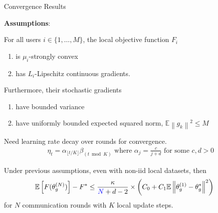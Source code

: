 \documentclass{beamer}
\newcommand\norm[1]{\left\lVert#1\right\rVert}
\begin{document}
\begin{frame}[allowframebreaks]{Convergence Results}

    \textbf{Assumptions}:

    \medskip
    For all users $i \in \{1, \ldots, M\}$, the local objective function $F_i$ 
    \begin{enumerate}
        \item is $\mu_i$-strongly convex 
        \item has $L_i$-Lipschitz continuous gradients.
    \end{enumerate}

    \medskip
    Furthermore, their stochastic gradients
    \begin{enumerate}
        \item have bounded variance
        \item have uniformly bounded expected squared norm, $\mathbb{E} \norm{g_k}^2 \leq M$
    \end{enumerate}


\framebreak
    Need learning rate decay over rounds for convergence.
    \begin{align}
        & \eta_t = \alpha_{\lfloor t / K \rfloor} \beta_{(t \bmod K)} 
            \textrm{ where } \alpha_j = \frac{c}{j + d} \textrm{ for some } c, d > 0 
    \end{align}

    \begin{theorem}
        \label{thm: full}
        Under previous assumptions, even with non-iid local datasets, then
        \begin{align*}
            & \mathbb{E} \left[ F ( \theta_g^{(N)} ) \right] - F^* \leq \dfrac{\kappa}{\textcolor{blue}{N} + d - 2} \times \left( C_0 + C_1 \mathbb{E} \norm{\theta_g^{(1)} - \theta_g^*}^2 \right) 
        \end{align*}
        for $N$ communication rounds with $K$ local update steps.
    \end{theorem}
    
\end{frame}
\end{document}
